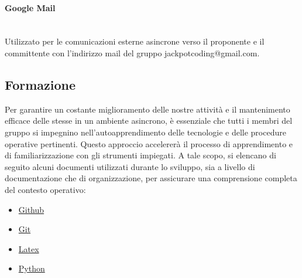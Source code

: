 \documentclass{article}
\begin{document}
\paragraph{Google Mail}~\\
Utilizzato per le comunicazioni esterne asincrone verso il proponente e il committente con l'indirizzo mail del gruppo jackpotcoding@gmail.com.

\subsection{Formazione}
Per garantire un costante miglioramento delle nostre attività e il mantenimento efficace delle stesse in un ambiente asincrono, è essenziale che tutti i membri del gruppo si impegnino nell'autoapprendimento delle tecnologie e delle procedure operative pertinenti. Questo approccio accelererà il processo di apprendimento e di familiarizzazione con gli strumenti impiegati. A tale scopo, si elencano di seguito alcuni documenti utilizzati durante lo sviluppo, sia a livello di documentazione che di organizzazione, per assicurare una comprensione completa del contesto operativo:

\begin{itemize} 
    \item \href{https://docs.github.com/en}{Github}
    \item \href{https://docs.github.com/en/get-started/using-git/pushing-commits-to-a-remote-repository}{Git}
    \item \href{https://www.overleaf.com/learn/latex/Learn_LaTeX_in_30_minutes}{Latex}
    \item \href{https://docs.python.org/3/tutorial/index.html}{Python}
\end{itemize}
\end{document}
